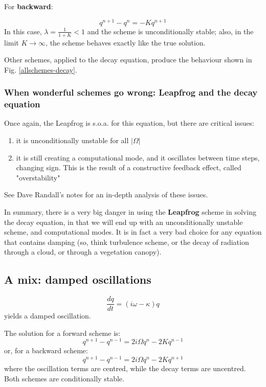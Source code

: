 For {\bf backward}:

\begin{equation}
	q^{n+1} -q^n = -K q^{n+1}
	\label{decay-solution-implicit}
\end{equation}
In this case, $\lambda = \frac{1}{1+K}<1$ and the scheme is unconditionally stable; also, in the limit $K \rightarrow \infty$, the scheme behaves exactly like the true solution.

Other schemes, applied to the decay equation, produce the behaviour shown in Fig. \ref{allschemes-decay}.

\subsubsection{When wonderful schemes go wrong: Leapfrog and the decay equation}
Once again, the Leapfrog is s.o.a. for this equation, but there are critical issues:
\begin{enumerate}
	\item it is unconditionally unstable for all $|\Omega|$
	\item it is still creating a computational mode, and it oscillates between time steps, changing sign. This is the result of a constructive feedback effect, called "overstability"
	\end{enumerate}
See Dave Randall's notes for an in-depth analysis of these issues.

In summary, there is a very big danger in using the {\bf Leapfrog} scheme in solving the decay equation, in that we will end up with an unconditionally unstable scheme, and computational modes. It is in fact a very bad choice for any equation that contains damping (so, think turbulence scheme, or the decay of radiation through a cloud, or through a vegetation canopy).
 
\subsection{A mix: damped oscillations}

\begin{equation}
	\frac{dq}{dt}= (i\omega - \kappa) q
	\label{decay}
\end{equation}
yields a damped oscillation.

The solution for a forward scheme is:
\begin{equation}
	q^{n+1} -q^{n-1}= 2i\Omega q^n - 2K q^{n-1}
	\label{oscill-decay-solution-forward}
\end{equation}
or, for a backward scheme:
\begin{equation}
	q^{n+1} -q^{n-1}= 2i\Omega q^n - 2K q^{n+1}
	\label{oscill-decay-solution-forward}
\end{equation}
where the oscillation terms are centred, while the decay terms are uncentred.
Both schemes are conditionally stable.

